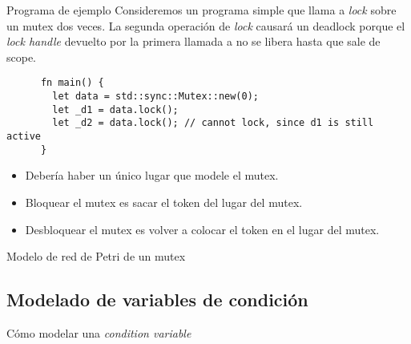 \documentclass{beamer}
\begin{document}
\begin{frame}[fragile]{Programa de ejemplo}
  Consideremos un programa simple que llama a \emph{lock} sobre un mutex dos veces.
  La segunda operación de \emph{lock} causará un deadlock
  porque el \emph{lock handle} devuelto por la primera llamada a 
  no se libera hasta que sale de scope.

  \vfill

  \begin{listing}
    \begin{verbatim}
      fn main() {
        let data = std::sync::Mutex::new(0);
        let _d1 = data.lock();
        let _d2 = data.lock(); // cannot lock, since d1 is still active
      }
    \end{verbatim}
  \end{listing}

  \vfill

  \begin{itemize}
    \item Debería haber un único lugar que modele el mutex.
    \item Bloquear el mutex es sacar el token del lugar del mutex.
    \item Desbloquear el mutex es volver a colocar el token en el lugar del mutex.
  \end{itemize}
\end{frame}

\begin{frame}{Modelo de red de Petri de un mutex}
  \begin{figure}
    \centering
    
  \end{figure}
\end{frame}

\subsection{Modelado de variables de condición}

\begin{frame}{Cómo modelar una \emph{condition variable}}
  \begin{figure}
    \centering
    
  \end{figure}
\end{frame}
\end{document}
